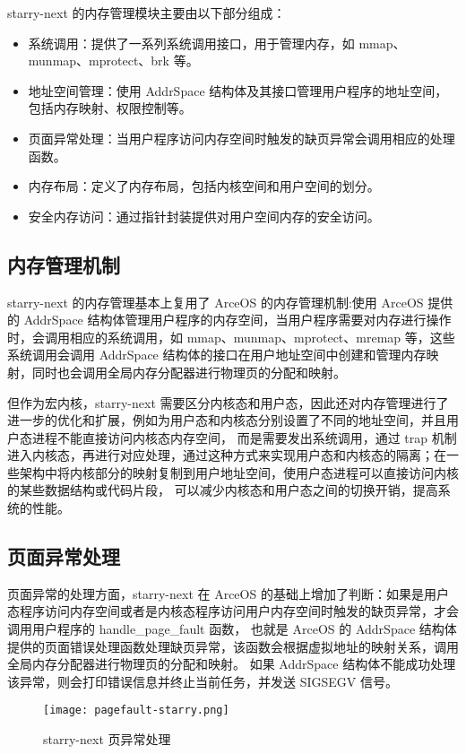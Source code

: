starry-next 的内存管理模块主要由以下部分组成：

\begin{itemize}
    \item 系统调用：提供了一系列系统调用接口，用于管理内存，如 mmap、munmap、mprotect、brk 等。
    \item 地址空间管理：使用 AddrSpace 结构体及其接口管理用户程序的地址空间，包括内存映射、权限控制等。
    \item 页面异常处理：当用户程序访问内存空间时触发的缺页异常会调用相应的处理函数。
    \item 内存布局：定义了内存布局，包括内核空间和用户空间的划分。
    \item 安全内存访问：通过指针封装提供对用户空间内存的安全访问。
\end{itemize}

\subsection{内存管理机制}

starry-next 的内存管理基本上复用了 ArceOS 的内存管理机制:使用 ArceOS 提供的 AddrSpace 结构体管理用户程序的内存空间，当用户程序需要对内存进行操作时，会调用相应的系统调用，如 mmap、munmap、mprotect、mremap 等，这些系统调用会调用 AddrSpace 结构体的接口在用户地址空间中创建和管理内存映射，同时也会调用全局内存分配器进行物理页的分配和映射。

但作为宏内核，starry-next 需要区分内核态和用户态，因此还对内存管理进行了进一步的优化和扩展，例如为用户态和内核态分别设置了不同的地址空间，并且用户态进程不能直接访问内核态内存空间，
而是需要发出系统调用，通过 trap 机制进入内核态，再进行对应处理，通过这种方式来实现用户态和内核态的隔离；在一些架构中将内核部分的映射复制到用户地址空间，使用户态进程可以直接访问内核的某些数据结构或代码片段，
可以减少内核态和用户态之间的切换开销，提高系统的性能。

\subsection{页面异常处理}
页面异常的处理方面，starry-next 在 ArceOS 的基础上增加了判断：如果是用户态程序访问内存空间或者是内核态程序访问用户内存空间时触发的缺页异常，才会调用用户程序的 handle\_page\_fault 函数，
也就是 ArceOS 的 AddrSpace 结构体提供的页面错误处理函数处理缺页异常，该函数会根据虚拟地址的映射关系，调用全局内存分配器进行物理页的分配和映射。
如果 AddrSpace 结构体不能成功处理该异常，则会打印错误信息并终止当前任务，并发送 SIGSEGV 信号。

\begin{figure}[H]
    \centering
    \texttt{[image: pagefault-starry.png]}
    \caption{starry-next 页异常处理}
    \label{fig:pagefault-starry}
\end{figure}

